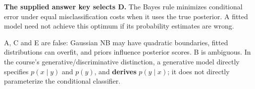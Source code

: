 \textbf{The supplied answer key selects D.} The Bayes rule minimizes conditional error under equal misclassification costs when it uses the true posterior. A fitted model need not achieve this optimum if its probability estimates are wrong.


A, C and E are false: Gaussian NB may have quadratic boundaries, fitted distributions can overfit, and priors influence posterior scores. B is ambiguous. In the course's generative/discriminative distinction, a generative model directly specifies \(p(x\mid y)\) and \(p(y)\), and \textbf{derives} \(p(y\mid x)\); it does not directly parameterize the conditional classifier.
